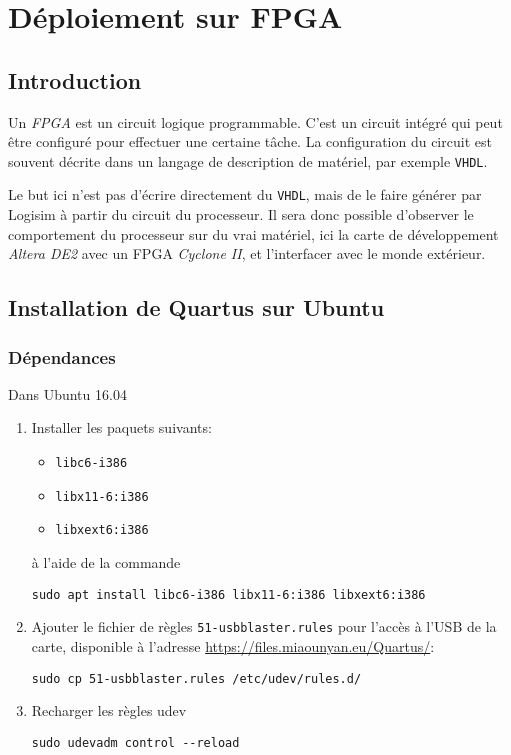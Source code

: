 \documentclass{article}
\begin{document}
    \section{Déploiement sur FPGA}
    \label{sec:FPGA}

    \subsection{Introduction}

    Un \textit{FPGA} est un circuit logique programmable.
    C'est un circuit intégré qui peut être configuré pour effectuer une certaine tâche.
    La configuration du circuit est souvent décrite dans un langage de description de matériel, par exemple \texttt{VHDL}.

    Le but ici n'est pas d'écrire directement du \texttt{VHDL}, mais de le faire générer par Logisim à partir du circuit du processeur.
    Il sera donc possible d'observer le comportement du processeur sur du vrai matériel, ici la carte de développement \textit{Altera DE2} avec un FPGA \textit{Cyclone II}, et l'interfacer avec le monde extérieur.

    \subsection{Installation de Quartus sur Ubuntu}

    \subsubsection{Dépendances}
    \noindent Dans Ubuntu 16.04
    \vspace{0.2em}
    \begin{enumerate}
        \item Installer les paquets suivants:
        \begin{itemize}
            \item \texttt{libc6-i386}
            \item \texttt{libx11-6:i386}
            \item \texttt{libxext6:i386}
        \end{itemize}
        à l'aide de la commande
        \begin{lstlisting}
sudo apt install libc6-i386 libx11-6:i386 libxext6:i386
        \end{lstlisting}

        \item Ajouter le fichier de règles \texttt{51-usbblaster.rules} pour l'accès à l'USB de la carte, disponible à l'adresse \url{https://files.miaounyan.eu/Quartus/}:
        \begin{lstlisting}
sudo cp 51-usbblaster.rules /etc/udev/rules.d/
        \end{lstlisting}
        \item Recharger les règles udev
        \begin{lstlisting}
sudo udevadm control --reload
        \end{lstlisting}
    \end{enumerate}
\end{document}
